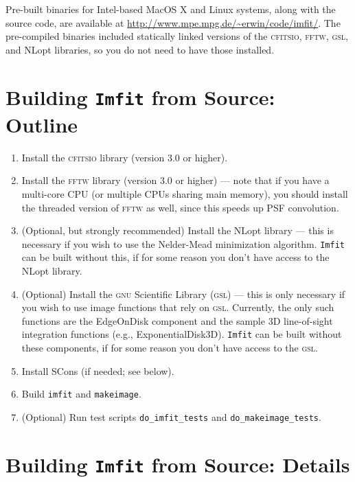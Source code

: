 \documentclass[10pt,a4paper,article]{memoir}
\newcommand{\imfit}{\texttt{imfit}}
\newcommand{\Imfit}{\texttt{Imfit}}
\newcommand{\makeimage}{\texttt{makeimage}}
\begin{document}
Pre-built binaries for Intel-based MacOS X and Linux systems, along with
the source code, are available at
\url{http://www.mpe.mpg.de/~erwin/code/imfit/}. The pre-compiled
binaries included statically linked versions of the \textsc{cfitsio},
\textsc{fftw}, \textsc{gsl}, and NLopt libraries, so you do not need to
have those installed.


\section{Building \Imfit{} from Source: Outline}

\begin{enumerate}
\item Install the \textsc{cfitsio} library (version 3.0 or higher).

\item Install the \textsc{fftw} library (version 3.0 or higher) --- note that if you have a
multi-core CPU (or multiple CPUs sharing main memory), you should
install the threaded version of \textsc{fftw} as well, since this speeds up PSF
convolution.

\item (Optional, but strongly recommended) Install the NLopt library ---
this is necessary if you wish to use the Nelder-Mead minimization
algorithm. \Imfit{} can be built without this, if for some reason
you don't have access to the NLopt library.

\item (Optional) Install the \textsc{gnu} Scientific Library
(\textsc{gsl}) --- this is only necessary if you wish to use image
functions that rely on \textsc{gsl}.  Currently, the only such functions
are the EdgeOnDisk component and the sample 3D line-of-sight integration
functions (e.g., ExponentialDisk3D). \Imfit{} can be built without these
components, if for some reason you don't have access to the \textsc{gsl}.

\item Install SCons (if needed; see below).

\item Build \imfit{} and \makeimage.

\item (Optional) Run test scripts \texttt{do\_imfit\_tests} and \texttt{do\_makeimage\_tests}.

\end{enumerate}

\section{Building \Imfit{} from Source: Details}\label{sec:build}
\end{document}
